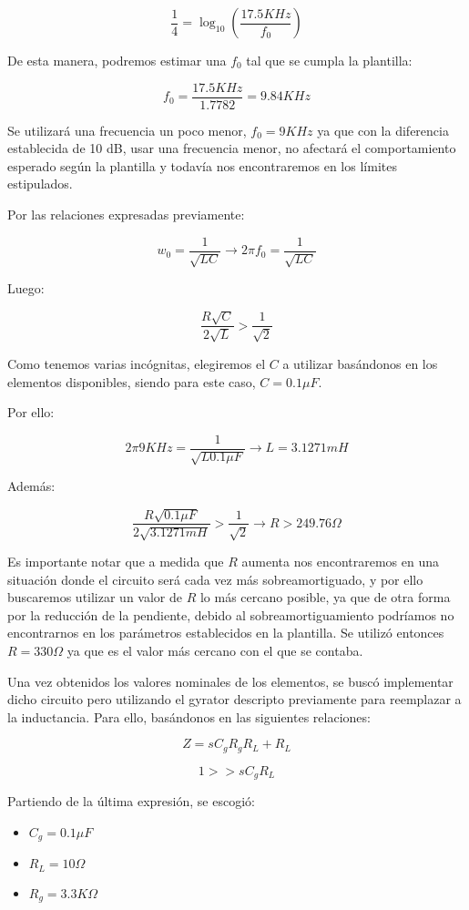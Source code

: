 $$\frac{1}{4}=\log_{10}(\frac{17.5KHz}{f_0})$$

De esta manera, podremos estimar una $f_0$ tal que se cumpla la plantilla:

$$f_0 = \frac{17.5KHz}{1.7782} = 9.84 KHz$$

Se utilizará una frecuencia un poco menor, $f_0=9 KHz$ ya que con la diferencia establecida de 10 dB, usar una frecuencia menor, no afectará el comportamiento 
esperado según la plantilla y todavía nos encontraremos en los límites estipulados.

Por las relaciones expresadas previamente:

$$w_0=\frac{1}{\sqrt{LC}} \longrightarrow 2\pi f_0=\frac{1}{\sqrt{LC}}$$

Luego:

$$\frac{R\sqrt{C}}{2\sqrt{L}} > \frac{1}{\sqrt{2}}$$

Como tenemos varias incógnitas, elegiremos el $C$ a utilizar basándonos en los elementos disponibles, siendo para este caso,
$C=0.1\mu F$.

Por ello:

$$2\pi 9KHz=\frac{1}{\sqrt{L0.1 \mu F}} \longrightarrow L = 3.1271 mH$$

Además:

$$\frac{R\sqrt{0.1\mu F}}{2\sqrt{3.1271mH}} > \frac{1}{\sqrt{2}} \longrightarrow R > 249.76 \Omega $$

Es importante notar que a medida que $R$ aumenta nos encontraremos en una situación donde el circuito será
cada vez más sobreamortiguado, y por ello buscaremos utilizar un valor de $R$ lo más cercano posible, ya que de otra forma
por la reducción de la pendiente, debido al sobreamortiguamiento podríamos no encontrarnos en los parámetros establecidos en la plantilla. 
Se utilizó entonces $R= 330 \Omega$ ya que es el valor más cercano con el que se contaba.

Una vez obtenidos los valores nominales de los elementos, se buscó implementar dicho circuito pero utilizando el gyrator descripto previamente
para reemplazar a la inductancia. Para ello, basándonos 
en las siguientes relaciones:

$$Z=sC_gR_gR_L+R_L$$

$$1 >> sC_gR_L$$

Partiendo de la última expresión, se escogió:

\begin{itemize}
	\item $C_g=0.1 \mu F$
	\item $R_L=10 \Omega$
	\item $R_g=3.3K \Omega$
\end{itemize}

